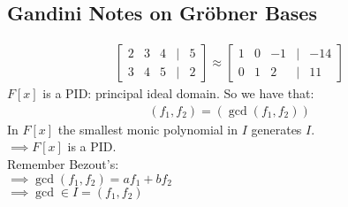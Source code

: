 \documentclass[10pt,oneside]{article}
\newcommand{\vpp}{\vspace{0.25cm}\\}
\begin{document}
\subsection*{Gandini Notes on Gröbner Bases}
\begin{align*}
    \begin{bmatrix}2&3&4&\mid &5 \\ 3&4&5&\mid &2\end{bmatrix}
    \approx 
    \begin{bmatrix}1&0&-1&\mid &-14 \\ 0&1&2&\mid &11\end{bmatrix}
\end{align*}
$F[x]$ is a PID: principal ideal domain. So we have that:
\begin{align*}
    (f_1,f_2)=(\gcd(f_1,f_2))
\end{align*}
In $F[x]$ the smallest monic polynomial in $I$ generates $I$.\\
$\implies F[x]$ is a PID.\vpp
Remember Bezout's:\\
$\implies \gcd(f_1,f_2)=af_1+bf_2$\\
$\implies \gcd \in I = (f_1,f_2)$
\end{document}
